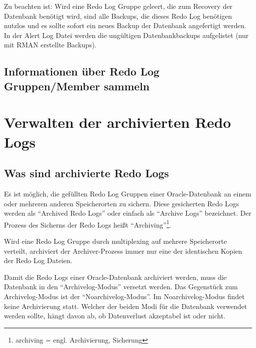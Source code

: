         \begin{merke}
          Zu beachten ist: Wird eine Redo Log Gruppe geleert, die zum Recovery der Datenbank benötigt wird, sind alle Backups, die dieses Redo Log benötigen nutzlos und es sollte sofort ein neues Backup der Datenbank angefertigt werden. In der Alert Log Datei werden die ungültigen Datenbankbackups aufgelistet (nur mit RMAN erstellte Backups).
        \end{merke}
\clearpage		
      \subsection{Informationen über Redo Log Gruppen/Member sammeln}
        \begin{literaturinternet}
          \item \cite{i1007497}
        \end{literaturinternet}
    \section{Verwalten der archivierten Redo Logs}
    \label{administeringarchivelogs}
      \subsection{Was sind archivierte Redo Logs}
        Es ist möglich, die gefüllten Redo Log Gruppen einer Oracle-Datenbank an einem oder mehreren anderen Speicherorten zu sichern. Diese gesicherten Redo Logs werden als \enquote{Archived Redo Logs} oder einfach als \enquote{Archive Logs} bezeichnet. Der Prozess des Sicherns der Redo Logs heißt \enquote{Archiving}\footnote{archiving = engl. Archivierung, Sicherung}.
 
        \begin{merke}
          Wird eine Redo Log Gruppe durch multiplexing auf mehrere Speicherorte verteilt, archiviert der Archiver-Prozess immer nur eine der identischen Kopien der Redo Log Dateien.
        \end{merke}
        Damit die Redo Logs einer Oracle-Datenbank archiviert werden, muss die Datenbank in den \enquote{Archivelog-Modus} versetzt werden. Das Gegenstück zum Archivelog-Modus ist der \enquote{Noarchivelog-Modus}. Im Noarchivelog-Modus findet keine Archivierung statt.
        Welcher der beiden Modi für die Datenbank verwendet werden sollte, hängt davon ab, ob Datenverlust akzeptabel ist oder nicht.

